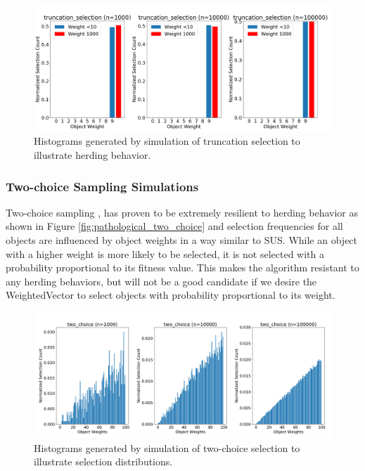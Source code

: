 \documentclass[12pt]{article}
\begin{document}
    \begin{figure}[htbp]
      \centering
      \includegraphics[scale=0.32]{images/pathological_truncation.png} 
      \caption{Histograms generated by simulation of truncation selection
               to illustrate herding behavior.}
      \label{fig:pathological_truncation}
    \end{figure}

    \subsubsection{Two-choice Sampling Simulations}
    Two-choice sampling \cite{2choice}, has proven to be extremely resilient to
    herding behavior as shown in Figure \ref{fig:pathological_two_choice} and
    selection frequencies for all objects are influenced by object weights in a
    way similar to SUS. While an object with a higher weight is more likely to
    be selected, it is not selected with a probability proportional to its
    fitness value. This makes the algorithm resistant to any herding behaviors,
    but will not be a good candidate if we desire the WeightedVector to select
    objects with probability proportional to its weight.

    \begin{figure}[htbp]
      \centering
      \includegraphics[scale=0.32]{images/herding_two_choice.png} 
      \caption{Histograms generated by simulation of two-choice selection
               to illustrate selection distributions.}
      \label{fig:herding_two_choice}
    \end{figure}
\end{document}
